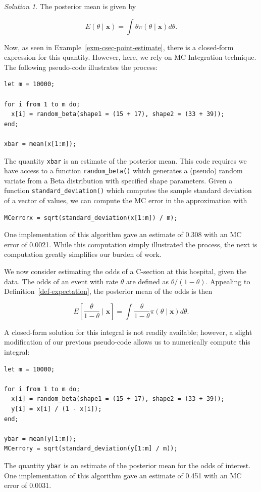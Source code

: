 \documentclass[
  letterpaper,
  DIV=11,
  numbers=noendperiod]{scrreprt}
\theoremstyle{definition}
\theoremstyle{definition}
\theoremstyle{plain}
\theoremstyle{remark}
\newtheorem*{solution}{Solution}
\begin{document}
\begin{solution}

The posterior mean is given by

\[E\left(\theta \mid \mathbf{x}\right) = \int \theta \pi(\theta \mid \mathbf{x}) d\theta.\]

Now, as seen in Example~\ref{exm-csec-point-estimate}, there is a
closed-form expression for this quantity. However, here, we rely on MC
Integration technique. The following pseudo-code illustrates the
process:

\begin{verbatim}
let m = 10000;

for i from 1 to m do;
  x[i] = random_beta(shape1 = (15 + 17), shape2 = (33 + 39));
end;
  
xbar = mean(x[1:m]);
\end{verbatim}

The quantity \texttt{xbar} is an estimate of the posterior mean. This
code requires we have access to a function \texttt{random\_beta()} which
generates a (pseudo) random variate from a Beta distribution with
specified shape parameters. Given a function
\texttt{standard\_deviation()} which computes the sample standard
deviation of a vector of values, we can compute the MC error in the
approximation with

\begin{verbatim}
MCerrorx = sqrt(standard_deviation(x[1:m]) / m);
\end{verbatim}

One implementation of this algorithm gave an estimate of 0.308 with an
MC error of 0.0021. While this computation simply illustrated the
process, the next is computation greatly simplifies our burden of work.

We now consider estimating the odds of a C-section at this hospital,
given the data. The odds of an event with rate \(\theta\) are defined as
\(\theta / (1 - \theta)\). Appealing to
Definition~\ref{def-expectation}, the posterior mean of the odds is then

\[E\left[\frac{\theta}{1 - \theta} \mid \mathbf{x}\right] = \int \frac{\theta}{1-\theta} \pi(\theta \mid \mathbf{x}) d\theta.\]

A closed-form solution for this integral is not readily available;
however, a slight modification of our previous pseudo-code allows us to
numerically compute this integral:

\begin{verbatim}
let m = 10000;

for i from 1 to m do;
  x[i] = random_beta(shape1 = (15 + 17), shape2 = (33 + 39));
  y[i] = x[i] / (1 - x[i]);
end;
  
ybar = mean(y[1:m]);
MCerrory = sqrt(standard_deviation(y[1:m] / m));
\end{verbatim}

The quantity \texttt{ybar} is an estimate of the posterior mean for the
odds of interest. One implementation of this algorithm gave an estimate
of 0.451 with an MC error of 0.0031.

\end{solution}
\end{document}
